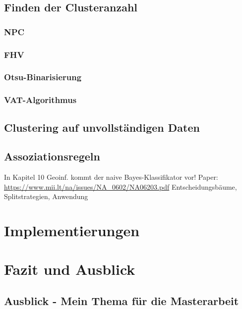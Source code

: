 \documentclass[11pt,ceqn]{book}
\begin{document}
\section{Finden der Clusteranzahl}
\subsection{NPC}
\subsection{FHV}
\subsection{Otsu-Binarisierung}
\subsection{VAT-Algorithmus}


\section{Clustering auf unvollständigen Daten}

\section{Assoziationsregeln}
In Kapitel 10 Geoinf. kommt der naive Bayes-Klassifikator vor!
Paper: \url{https://www.mii.lt/na/issues/NA_0602/NA06203.pdf}
Entscheidungsbäume, Splitstrategien, Anwendung

\chapter{Implementierungen}


\chapter{Fazit und Ausblick}
\section{Ausblick - Mein Thema für die Masterarbeit}


\printbibliography
\vfill
\end{document}
